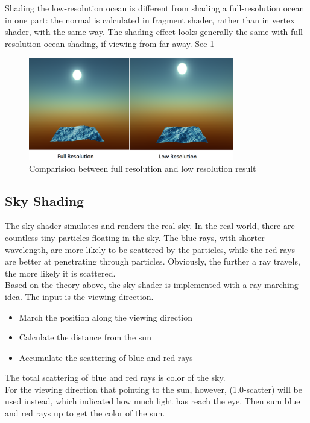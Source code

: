 \documentclass{jcgt}
\begin{document}
Shading the low-resolution ocean is different from shading a full-resolution ocean in one part: the normal is calculated in fragment shader, rather than in vertex shader, with the same way. The shading effect looks generally the same with full-resolution ocean shading, if viewing from far away. See \ref{fig:lowres}

\begin{figure}[htb]
\centering
   \includegraphics[width=0.8\textwidth]{lowres.png}
   \caption{\label{fig:lowres}
      Comparision between full resolution and low resolution result}

\end{figure}
\subsection{Sky Shading}
\label{sec:skyshading}
The sky shader simulates and renders the real sky. In the real world, there are countless tiny particles floating in the sky. The blue rays, with shorter wavelength, are more likely to be scattered by the particles, while the red rays are better at penetrating through particles. Obviously, the further a ray travels, the more likely it is scattered. \\

Based on the theory above, the sky shader is implemented with a ray-marching idea. The input is the viewing direction.
\begin{itemize}
\item[1.] March the position along the viewing direction
\item[2.] Calculate the distance from the sun
\item[3.] Accumulate the scattering of blue and red rays
\end{itemize}
The total scattering of blue and red rays is color of the sky.\\

For the viewing direction that pointing to the sun, however, (1.0-scatter) will be used instead, which indicated how much light has reach the eye. Then sum blue and red rays up to get the color of the sun.\\
\end{document}
